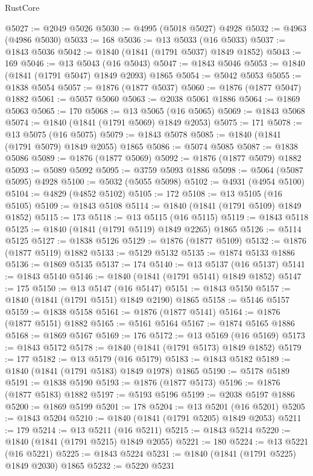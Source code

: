 \begin{lexlean}{RustCore}
\begin{coremodule}
@5027 := @2049 @5026
@5030 := @4995 (@5018 @5027) @4928
@5032 := @4963 (@4986 @5030)
@5033 := 168
@5036 := @13 @5033 (@16 @5033)
@5037 := @1843 @5036
@5042 := @1840 (@1841 (@1791 @5037) @1849 @1852)
@5043 := 169
@5046 := @13 @5043 (@16 @5043)
@5047 := @1843 @5046
@5053 := @1840 (@1841 (@1791 @5047) @1849 @2093) @1865
@5054 := @5042 @5053
@5055 := @1838 @5054
@5057 := @1876 (@1877 @5037)
@5060 := @1876 (@1877 @5047) @1882
@5061 := @5057 @5060
@5063 := @2038 @5061 @1886
@5064 := @1869 @5063
@5065 := 170
@5068 := @13 @5065 (@16 @5065)
@5069 := @1843 @5068
@5074 := @1840 (@1841 (@1791 @5069) @1849 @2053)
@5075 := 171
@5078 := @13 @5075 (@16 @5075)
@5079 := @1843 @5078
@5085 := @1840 (@1841 (@1791 @5079) @1849 @2055) @1865
@5086 := @5074 @5085
@5087 := @1838 @5086
@5089 := @1876 (@1877 @5069)
@5092 := @1876 (@1877 @5079) @1882
@5093 := @5089 @5092
@5095 := @3759 @5093 @1886
@5098 := @5064 (@5087 @5095) @4928
@5100 := @5032 (@5055 @5098)
@5102 := @4931 (@4954 @5100)
@5104 := @4829 (@4852 @5102)
@5105 := 172
@5108 := @13 @5105 (@16 @5105)
@5109 := @1843 @5108
@5114 := @1840 (@1841 (@1791 @5109) @1849 @1852)
@5115 := 173
@5118 := @13 @5115 (@16 @5115)
@5119 := @1843 @5118
@5125 := @1840 (@1841 (@1791 @5119) @1849 @2265) @1865
@5126 := @5114 @5125
@5127 := @1838 @5126
@5129 := @1876 (@1877 @5109)
@5132 := @1876 (@1877 @5119) @1882
@5133 := @5129 @5132
@5135 := @1874 @5133 @1886
@5136 := @1869 @5135
@5137 := 174
@5140 := @13 @5137 (@16 @5137)
@5141 := @1843 @5140
@5146 := @1840 (@1841 (@1791 @5141) @1849 @1852)
@5147 := 175
@5150 := @13 @5147 (@16 @5147)
@5151 := @1843 @5150
@5157 := @1840 (@1841 (@1791 @5151) @1849 @2190) @1865
@5158 := @5146 @5157
@5159 := @1838 @5158
@5161 := @1876 (@1877 @5141)
@5164 := @1876 (@1877 @5151) @1882
@5165 := @5161 @5164
@5167 := @1874 @5165 @1886
@5168 := @1869 @5167
@5169 := 176
@5172 := @13 @5169 (@16 @5169)
@5173 := @1843 @5172
@5178 := @1840 (@1841 (@1791 @5173) @1849 @1852)
@5179 := 177
@5182 := @13 @5179 (@16 @5179)
@5183 := @1843 @5182
@5189 := @1840 (@1841 (@1791 @5183) @1849 @1978) @1865
@5190 := @5178 @5189
@5191 := @1838 @5190
@5193 := @1876 (@1877 @5173)
@5196 := @1876 (@1877 @5183) @1882
@5197 := @5193 @5196
@5199 := @2038 @5197 @1886
@5200 := @1869 @5199
@5201 := 178
@5204 := @13 @5201 (@16 @5201)
@5205 := @1843 @5204
@5210 := @1840 (@1841 (@1791 @5205) @1849 @2053)
@5211 := 179
@5214 := @13 @5211 (@16 @5211)
@5215 := @1843 @5214
@5220 := @1840 (@1841 (@1791 @5215) @1849 @2055)
@5221 := 180
@5224 := @13 @5221 (@16 @5221)
@5225 := @1843 @5224
@5231 := @1840 (@1841 (@1791 @5225) @1849 @2030) @1865
@5232 := @5220 @5231

\end{coremodule}
\end{lexlean}
